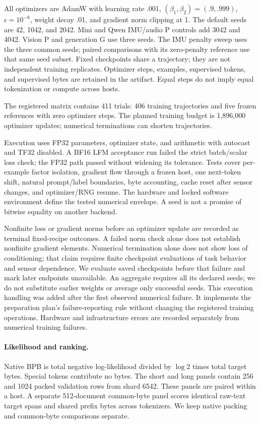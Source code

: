 \documentclass[11pt]{article}
\begin{document}
All optimizers are AdamW with learning rate .001, $(\beta_1,\beta_2)=(.9,.999)$,
$\epsilon=10^{-8}$, weight decay .01, and gradient norm clipping at 1.
The default seeds are 42, 1042, and 2042. Mini and Qwen IMU/audio P controls add
3042 and 4042. Vision P and generation G use three seeds. The IMU penalty sweep
uses the three common seeds; paired comparisons with its zero-penalty reference
use that same seed subset. Fixed checkpoints share a trajectory; they are not
independent training replicates. Optimizer steps, examples, supervised tokens,
and supervised bytes are retained in the artifact. Equal steps do not imply
equal tokenization or compute across hosts.

The registered matrix contains 411 trials: 406 training trajectories and five
frozen references with zero optimizer steps. The planned training budget is
1,896,000 optimizer updates; numerical terminations can shorten trajectories.

Execution uses FP32 parameters, optimizer state, and arithmetic with autocast
and TF32 disabled. A BF16 LFM acceptance run failed the strict batch/scalar loss
check; the FP32 path passed without widening its tolerance. Tests cover
per-example factor isolation, gradient flow through a frozen host, one
next-token shift, natural prompt/label boundaries, byte accounting, cache
reset after sensor changes, and optimizer/RNG resume. The hardware and locked
software environment define the tested numerical envelope. A seed is not a
promise of bitwise equality on another backend.

Nonfinite loss or gradient norms before an optimizer update are recorded as
terminal fixed-recipe outcomes. A failed norm check alone does not establish
nonfinite gradient elements. Numerical termination alone does not show loss of
conditioning; that claim requires finite checkpoint evaluations of task behavior
and sensor dependence. We evaluate saved checkpoints before that failure
and mark later endpoints unavailable. An aggregate requires all its declared seeds;
we do not substitute earlier weights or average only successful seeds. This
execution handling was added after the first observed numerical failure. It
implements the preparation plan's failure-reporting rule without changing the
registered training operations. Hardware and infrastructure errors are recorded
separately from numerical training failures.

\paragraph{Likelihood and ranking.}
Native BPB is total negative log-likelihood divided by $\log 2$ times total
target bytes. Special tokens contribute no bytes. The short and long panels
contain 256 and 1024 packed validation rows from shard 6542. These panels are
paired within a host. A separate 512-document common-byte panel scores
identical raw-text target spans and shared prefix bytes across tokenizers.
We keep native packing and common-byte comparisons separate.
\end{document}
